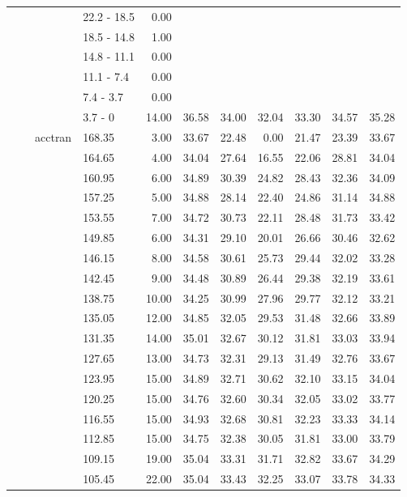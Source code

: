 \begin{longtable}{llllrrrrrrr}
   &  &  & 22.2 - 18.5 & 0.00 &  &  &  &  &  &  \\ 
   &  &  & 18.5 - 14.8 & 1.00 &  &  &  &  &  &  \\ 
   &  &  & 14.8 - 11.1 & 0.00 &  &  &  &  &  &  \\ 
   &  &  & 11.1 - 7.4 & 0.00 &  &  &  &  &  &  \\ 
   &  &  & 7.4 - 3.7 & 0.00 &  &  &  &  &  &  \\ 
   &  &  & 3.7 - 0 & 14.00 & 36.58 & 34.00 & 32.04 & 33.30 & 34.57 & 35.28 \\ 
   &  & acctran & 168.35 & 3.00 & 33.67 & 22.48 & 0.00 & 21.47 & 23.39 & 33.67 \\ 
   &  &  & 164.65 & 4.00 & 34.04 & 27.64 & 16.55 & 22.06 & 28.81 & 34.04 \\ 
   &  &  & 160.95 & 6.00 & 34.89 & 30.39 & 24.82 & 28.43 & 32.36 & 34.09 \\ 
   &  &  & 157.25 & 5.00 & 34.88 & 28.14 & 22.40 & 24.86 & 31.14 & 34.88 \\ 
   &  &  & 153.55 & 7.00 & 34.72 & 30.73 & 22.11 & 28.48 & 31.73 & 33.42 \\ 
   &  &  & 149.85 & 6.00 & 34.31 & 29.10 & 20.01 & 26.66 & 30.46 & 32.62 \\ 
   &  &  & 146.15 & 8.00 & 34.58 & 30.61 & 25.73 & 29.44 & 32.02 & 33.28 \\ 
   &  &  & 142.45 & 9.00 & 34.48 & 30.89 & 26.44 & 29.38 & 32.19 & 33.61 \\ 
   &  &  & 138.75 & 10.00 & 34.25 & 30.99 & 27.96 & 29.77 & 32.12 & 33.21 \\ 
   &  &  & 135.05 & 12.00 & 34.85 & 32.05 & 29.53 & 31.48 & 32.66 & 33.89 \\ 
   &  &  & 131.35 & 14.00 & 35.01 & 32.67 & 30.12 & 31.81 & 33.03 & 33.94 \\ 
   &  &  & 127.65 & 13.00 & 34.73 & 32.31 & 29.13 & 31.49 & 32.76 & 33.67 \\ 
   &  &  & 123.95 & 15.00 & 34.89 & 32.71 & 30.62 & 32.10 & 33.15 & 34.04 \\ 
   &  &  & 120.25 & 15.00 & 34.76 & 32.60 & 30.34 & 32.05 & 33.02 & 33.77 \\ 
   &  &  & 116.55 & 15.00 & 34.93 & 32.68 & 30.81 & 32.23 & 33.33 & 34.14 \\ 
   &  &  & 112.85 & 15.00 & 34.75 & 32.38 & 30.05 & 31.81 & 33.00 & 33.79 \\ 
   &  &  & 109.15 & 19.00 & 35.04 & 33.31 & 31.71 & 32.82 & 33.67 & 34.29 \\ 
   &  &  & 105.45 & 22.00 & 35.04 & 33.43 & 32.25 & 33.07 & 33.78 & 34.33 \\ 

\end{longtable}

